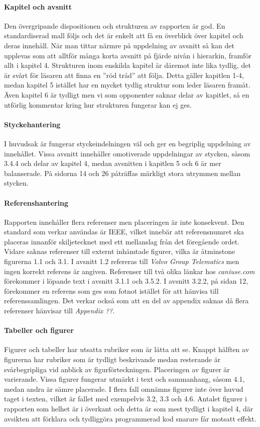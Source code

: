    \paragraph{Kapitel och avsnitt}
        Den övergripande dispositionen och strukturen av rapporten är god. En standardiserad mall följs och det är enkelt att få en överblick över kapitel och deras innehåll. När man tittar närmre på uppdelning av avsnitt så kan det upplevas som att alltför många korta avsnitt på fjärde nivån i hierarkin, framför allt i kapitel 4. Strukturen inom enskilda kapitel är däremot inte lika tydlig, det är svårt för läsaren att finna en ''röd tråd'' att följa. Detta gäller kapitlen 1-4, medan kapitel 5 istället har en mycket tydlig struktur som leder läsaren framåt. Även kapitel 6 är tydligt men vi som opponenter saknar delar av kapitlet, så en utförlig kommentar kring hur strukturen fungerar kan ej ges.
     
    \paragraph{Styckehantering}
        I huvudsak är fungerar styckeindelningen väl och ger en begriplig uppdelning av innehållet. Vissa avsnitt innehåller omotiverade uppdelningar av stycken, såsom 3.4.4 och delar av kapitel 4, medan avsnitten i kapitlen 5 och 6 är mer balanserade. På sidorna 14 och 26 påträffas märkligt stora utrymmen mellan stycken.

    \paragraph{Referenshantering}
        Rapporten innehåller flera referenser men placeringen är inte konsekvent. Den standard som verkar användas är IEEE, vilket innebär att referensnumret ska placeras innanför skiljetecknet med ett mellanslag från det föregående ordet. Vidare saknas referenser till externt inhämtade figurer, vilka är åtminstone figurerna 1.1 och 3.1. I avsnitt 1.2 refereras till \emph{Volvo Group Telematics} men ingen korrekt referens är angiven. Referenser till två olika länkar hos \emph{caniuse.com} förekommer i löpande text i avsnitt 3.1.1 och 3.5.2. I avsnitt 3.2.2, på sidan 12, förekommer en referens som ges som fotnot istället för att hänvisa till referenssamlingen. Det verkar också som att en del av appendix saknas då flera referenser hänvisar till \emph{Appendix ??}.
    
    \paragraph{Tabeller och figurer}
        Figurer och tabeller har utsatta rubriker som är lätta att se. Knappt hälften av figurerna har rubriker som är tydligt beskrivande medan resterande är svårbegripliga vid anblick av figurförteckningen. Placeringen av figurer är varierande. Vissa figurer fungerar utmärkt i text och sammanhang, såsom 4.1, medan andra är sämre placerade. I flera fall omnämns figurer inte över huvud taget i texten, vilket är fallet med exempelvis 3.2, 3.3 och 4.6. Antalet figurer i rapporten som helhet är i överkant och detta är som mest tydligt i kapitel 4, där avsikten att förklara och tydliggöra programmerad kod snarare får motsatt effekt.
    

